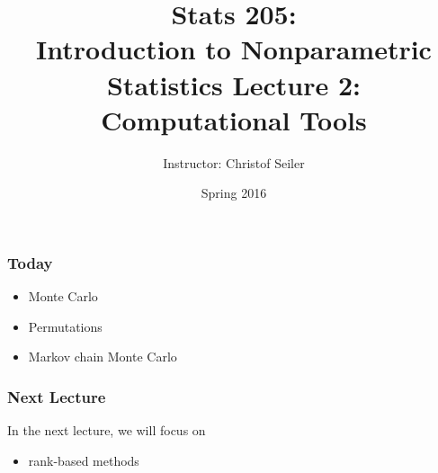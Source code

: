 \documentclass[10pt]{beamer}
\title{\large \bfseries Stats 205: \\ Introduction to Nonparametric Statistics \linebreak \linebreak \linebreak
Lecture 2: \\ Computational Tools}
\author{Instructor: Christof Seiler}
\date{Spring 2016}
\begin{document}
\frame{
\thispagestyle{empty}
\titlepage
}

\begin{frame}
\frametitle{Today}

\begin{itemize}
\item Monte Carlo
\item Permutations
\item Markov chain Monte Carlo
\end{itemize}

\end{frame}

\begin{frame}
\frametitle{Next Lecture}

In the next lecture, we will focus on
\begin{itemize}
\item rank-based methods
\end{itemize}

\end{frame}
\end{document}

